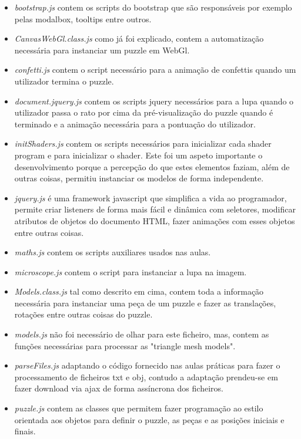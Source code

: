 \documentclass[pdftex,12pt,a4paper]{report}
\begin{document}
\begin{itemize}  
        \item \textit{bootstrap.js} contem os scripts do bootstrap que são responsáveis por exemplo pelas modalbox, tooltips entre outros.
        \item \textit{CanvasWebGl.class.js} como já foi explicado, contem a automatização necessária para instanciar um puzzle em WebGl.
        \item \textit{confetti.js} contem o script necessário para a animação de confettis quando um utilizador termina o puzzle.
        \item \textit{document.jquery.js} contem os scripts jquery necessários para a lupa quando o utilizador passa o rato por cima da pré-visualização do puzzle quando é terminado e a animação necessária para a pontuação do utilizador.
        \item \textit{initShaders.js} contem os scripts necessários para inicializar cada shader program e para inicializar o shader. Este foi um aspeto importante o desenvolvimento porque a percepção do que estes elementos faziam, além de outras coisas, permitiu instanciar os modelos de forma independente.
        \item \textit{jquery.js} é uma framework javascript que simplifica a vida ao programador, permite criar listeners de forma mais fácil e dinâmica com seletores, modificar atributos de objetos do documento HTML, fazer animações com esses objetos entre outras coisas.
        \item \textit{maths.js} contem os scripts auxiliares usados nas aulas.
        \item \textit{microscope.js} contem o script para instanciar a lupa na imagem.
        \item \textit{Models.class.js} tal como descrito em cima, contem toda a informação necessária para instanciar uma peça de um puzzle e fazer as translações, rotações entre outras coisas do puzzle.
        \item \textit{models.js} não foi necessário de olhar para este ficheiro, mas, contem as funções necessárias para processar as "triangle mesh models".
        \item \textit{parseFiles.js} adaptando o código fornecido nas aulas práticas para fazer o processamento de ficheiros txt e obj, contudo a adaptação prendeu-se em fazer download via ajax de forma assíncrona dos ficheiros.
        \item \textit{puzzle.js} contem as classes que permitem fazer programação ao estilo orientada aos objetos para definir o puzzle, as peças e as posições iniciais e finais.

\end{itemize}
\end{document}
